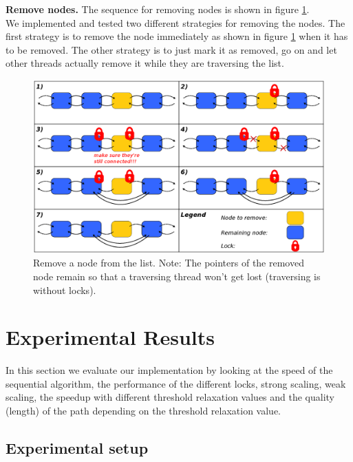 \documentclass[letterpaper]{article}
\newcommand{\mypar}[1]{{\bf #1.}}
\begin{document}
\mypar{Remove nodes}
The sequence for removing nodes is shown in  figure \ref{fig:remove}.\\
We implemented and tested two different strategies for removing the nodes. The first strategy is to remove the node immediately as shown in figure \ref{fig:remove} when it has to be removed. The other strategy is to just mark it as removed, go on and let other threads actually remove it while they are traversing the list.

\begin{figure}[h]\centering
  \includegraphics[scale=0.31]{remove.eps}
  \caption{Remove a node from the list. Note: The pointers of the removed node remain so that a traversing thread won't get lost (traversing is without locks). \label{fig:remove}}
\end{figure}



\section{Experimental Results}\label{sec:exp}

In this section we evaluate our implementation by looking at the speed of the sequential algorithm, the performance of the different locks, strong scaling, weak scaling, the speedup with different threshold relaxation values and the quality (length) of the path depending on the threshold relaxation value.

\subsection{Experimental setup}\label{ssec:setup}
\end{document}
